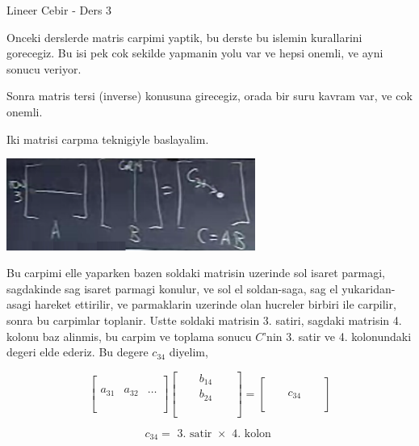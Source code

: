 \documentclass[12pt,fleqn]{article}\usepackage{../common}
\begin{document}
Lineer Cebir - Ders 3

Onceki derslerde matris carpimi yaptik, bu derste bu islemin kurallarini
gorecegiz. Bu isi pek cok sekilde yapmanin yolu var ve hepsi onemli, ve
ayni sonucu veriyor.

Sonra matris tersi (inverse) konusuna girecegiz, orada bir suru kavram var,
ve cok onemli. 

Iki matrisi carpma teknigiyle baslayalim. 

\includegraphics[height=3cm]{3_01.png}

Bu carpimi elle yaparken bazen soldaki matrisin uzerinde sol isaret
parmagi, sagdakinde sag isaret parmagi konulur, ve sol el soldan-saga, sag
el yukaridan-asagi hareket ettirilir, ve parmaklarin uzerinde olan hucreler
birbiri ile carpilir, sonra bu carpimlar toplanir. Ustte soldaki matrisin
3. satiri, sagdaki matrisin 4. kolonu baz alinmis, bu carpim ve toplama
sonucu $C$'nin 3. satir ve 4. kolonundaki degeri elde ederiz. Bu degere
$c_{34}$ diyelim,

$$ 
\left[\begin{array}{rrrr}
\\
\\
a_{31} & a_{32} & \dots \\
\\
\\
\end{array}\right]
\left[\begin{array}{rrrrr}
& & b_{14} & & \\
& & b_{24} & & \\
& &  & & \\
& &  & & \\
& &  & & 
\end{array}\right] 
=
\left[\begin{array}{rrrrr}
& &  & & \\
& &  & & \\
& & c_{34} & & \\
& &  & & \\
& &  & & 
\end{array}\right]
$$

$$ c_{34} = \textrm{ 3. satir } \times \textrm{ 4. kolon } $$
\end{document}
